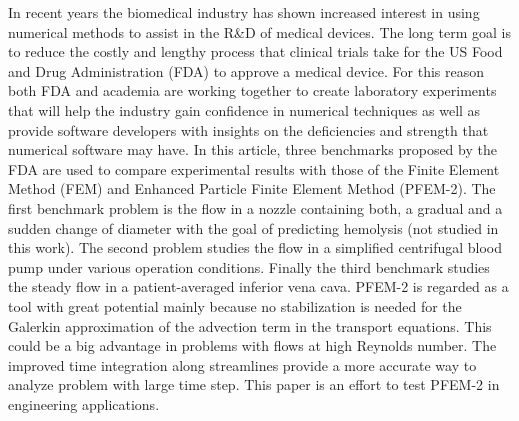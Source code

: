 In recent years the biomedical industry has shown increased interest in using numerical methods to assist in the R\&D of medical devices. The long term goal is to reduce the costly and lengthy process that clinical trials take for the US Food and Drug Administration (FDA) to approve a medical device. For this reason both FDA and academia are working together to create laboratory experiments that will help the industry gain confidence in numerical techniques as well as provide software developers with insights on the deficiencies and strength that numerical software may have. In this article, three benchmarks proposed by the FDA are used to compare experimental results with those of the Finite Element Method (FEM) and Enhanced Particle Finite Element Method (PFEM-2). The first benchmark problem is the flow in a nozzle
containing both, a gradual and a sudden change of diameter with the goal of predicting hemolysis (not studied in this work). The second problem studies the flow in a simplified centrifugal
blood pump under various operation conditions. Finally the third benchmark studies the steady flow in a patient-averaged inferior vena cava. PFEM-2 is regarded as a tool with great potential mainly because no stabilization is needed for the Galerkin approximation of the advection term in the transport equations. This could be a big advantage in problems with flows at high Reynolds number. The improved time integration along streamlines provide a more accurate way to analyze problem with large time step. This paper is an effort to test PFEM-2 in engineering applications.
